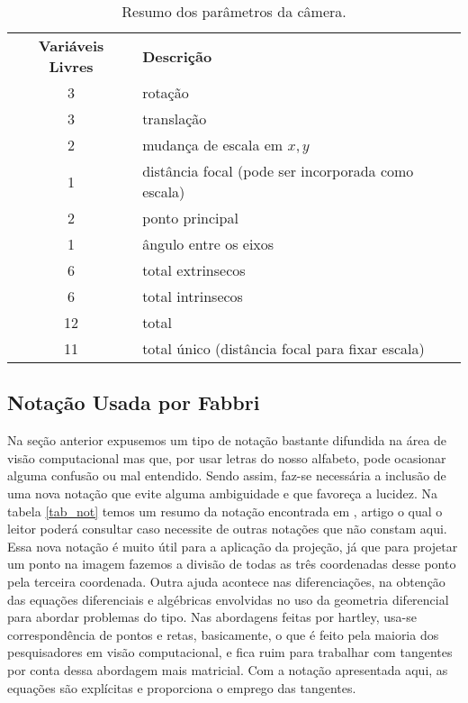 \begin{table}
\begin{center}
\begin{tabular}{c l} 
\textbf{Variáveis Livres} & \textbf{Descrição}\\
3	 & rotação \\
3	 & translação \\
2	 & mudança de escala em $x,y$\\
1	 & distância focal (pode ser incorporada como escala)\\
2	 & ponto principal\\
1	 & ângulo entre os eixos \\
6  & total extrinsecos\\
6  & total intrinsecos\\
12 & total\\
11 & total único (distância focal para fixar escala)
\end{tabular}
\end{center}
\caption{Resumo dos parâmetros da câmera.}
\end{table}










\subsection{Notação Usada por Fabbri}

Na seção anterior expusemos um tipo de notação bastante difundida na área de visão computacional mas que, por usar letras do nosso alfabeto, pode ocasionar alguma confusão ou mal entendido. Sendo assim, faz-se necessária a inclusão de uma nova notação que evite alguma ambiguidade e que favoreça a lucidez. Na tabela \ref{tab_not} temos um resumo da notação encontrada em \cite{Fabbri:Kimia:IJCV2015}, artigo o qual o leitor poderá consultar caso necessite de outras notações que não constam aqui. Essa nova notação é muito útil para a aplicação da projeção, já que para projetar um ponto na imagem fazemos a divisão de todas as três coordenadas desse ponto pela terceira coordenada. Outra ajuda acontece nas diferenciações, na obtenção das equações diferenciais e algébricas envolvidas no uso da geometria diferencial para abordar problemas do tipo. Nas abordagens feitas por hartley, usa-se correspondência de pontos e retas, basicamente, o que é feito pela maioria dos pesquisadores em visão computacional, e fica ruim para trabalhar com tangentes por conta dessa abordagem mais matricial. Com a notação apresentada aqui, as equações são explícitas e proporciona o emprego das tangentes.

